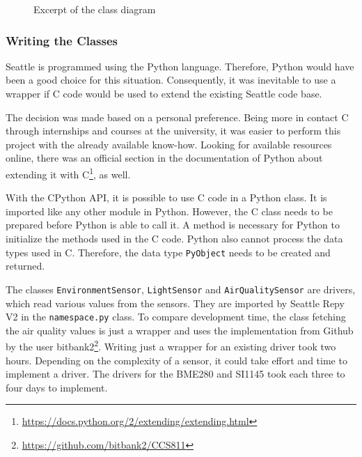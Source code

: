 \documentclass{article}      %
\begin{document}
\begin{figure}[ht]
	\caption{Excerpt of the class diagram}
	\label{fig:classDiagram}
\end{figure}

\subsubsection{Writing the Classes}

Seattle is programmed using the Python language. Therefore, Python would have been a good choice for this situation. Consequently, it was inevitable to use a wrapper if C code would be used to extend the existing Seattle code base. 

The decision was made based on a personal preference. Being more in contact C through internships and courses at the university, it was easier to perform this project with the already available know-how. Looking for available resources online, there was an official section in the documentation of Python about extending it with C\footnote{\url{https://docs.python.org/2/extending/extending.html}}, as well.

With the CPython \gls{API}, it is possible to use C code in a Python class. It is imported like any other module in Python. However, the C class needs to be prepared before Python is able to call it. A method is necessary for Python to initialize the methods used in the C code. Python also cannot process the data types used in C. Therefore, the data type \texttt{PyObject} needs to be created and returned.

The classes \texttt{EnvironmentSensor}, \texttt{LightSensor} and \texttt{AirQualitySensor} are drivers, which read various values from the sensors. They are imported by Seattle \gls{Repy} V2 in the \texttt{namespace.py} class. To compare development time, the class fetching the air quality values is just a wrapper and uses the implementation from Github by the user bitbank2\footnote{\url{https://github.com/bitbank2/CCS811}}. Writing just a wrapper for an existing driver took two hours. Depending on the complexity of a sensor, it could take effort and time to implement a driver. The drivers for the BME280 and SI1145 took each three to four days to implement.
\end{document}
